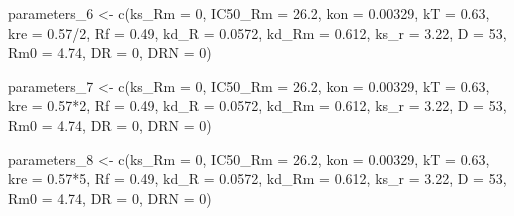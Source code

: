 \documentclass[
]{article}
\newenvironment{Shaded}{\begin{snugshade}}{\end{snugshade}}
\newcommand{\AttributeTok}[1]{\textcolor[rgb]{0.77,0.63,0.00}{#1}}
\newcommand{\DecValTok}[1]{\textcolor[rgb]{0.00,0.00,0.81}{#1}}
\newcommand{\FloatTok}[1]{\textcolor[rgb]{0.00,0.00,0.81}{#1}}
\newcommand{\FunctionTok}[1]{\textcolor[rgb]{0.00,0.00,0.00}{#1}}
\newcommand{\NormalTok}[1]{#1}
\newcommand{\OtherTok}[1]{\textcolor[rgb]{0.56,0.35,0.01}{#1}}
\newcommand{\SpecialCharTok}[1]{\textcolor[rgb]{0.00,0.00,0.00}{#1}}
\begin{document}
\begin{Shaded}
\begin{Highlighting}[]
\NormalTok{parameters\_6 }\OtherTok{\textless{}{-}} \FunctionTok{c}\NormalTok{(}\AttributeTok{ks\_Rm =} \DecValTok{0}\NormalTok{, }\AttributeTok{IC50\_Rm =} \FloatTok{26.2}\NormalTok{, }\AttributeTok{kon =} \FloatTok{0.00329}\NormalTok{,}
                \AttributeTok{kT =} \FloatTok{0.63}\NormalTok{, }\AttributeTok{kre =} \FloatTok{0.57}\SpecialCharTok{/}\DecValTok{2}\NormalTok{, }\AttributeTok{Rf =} \FloatTok{0.49}\NormalTok{, }\AttributeTok{kd\_R =} \FloatTok{0.0572}\NormalTok{,}
                \AttributeTok{kd\_Rm =} \FloatTok{0.612}\NormalTok{, }\AttributeTok{ks\_r =} \FloatTok{3.22}\NormalTok{, }\AttributeTok{D =} \DecValTok{53}\NormalTok{, }\AttributeTok{Rm0 =} \FloatTok{4.74}\NormalTok{,}
                \AttributeTok{DR =} \DecValTok{0}\NormalTok{, }\AttributeTok{DRN =} \DecValTok{0}\NormalTok{)}

\NormalTok{parameters\_7 }\OtherTok{\textless{}{-}} \FunctionTok{c}\NormalTok{(}\AttributeTok{ks\_Rm =} \DecValTok{0}\NormalTok{, }\AttributeTok{IC50\_Rm =} \FloatTok{26.2}\NormalTok{, }\AttributeTok{kon =} \FloatTok{0.00329}\NormalTok{,}
                \AttributeTok{kT =} \FloatTok{0.63}\NormalTok{, }\AttributeTok{kre =} \FloatTok{0.57}\SpecialCharTok{*}\DecValTok{2}\NormalTok{, }\AttributeTok{Rf =} \FloatTok{0.49}\NormalTok{, }\AttributeTok{kd\_R =} \FloatTok{0.0572}\NormalTok{,}
                \AttributeTok{kd\_Rm =} \FloatTok{0.612}\NormalTok{, }\AttributeTok{ks\_r =} \FloatTok{3.22}\NormalTok{, }\AttributeTok{D =} \DecValTok{53}\NormalTok{, }\AttributeTok{Rm0 =} \FloatTok{4.74}\NormalTok{,}
                \AttributeTok{DR =} \DecValTok{0}\NormalTok{, }\AttributeTok{DRN =} \DecValTok{0}\NormalTok{)}

\NormalTok{parameters\_8 }\OtherTok{\textless{}{-}} \FunctionTok{c}\NormalTok{(}\AttributeTok{ks\_Rm =} \DecValTok{0}\NormalTok{, }\AttributeTok{IC50\_Rm =} \FloatTok{26.2}\NormalTok{, }\AttributeTok{kon =} \FloatTok{0.00329}\NormalTok{,}
                \AttributeTok{kT =} \FloatTok{0.63}\NormalTok{, }\AttributeTok{kre =} \FloatTok{0.57}\SpecialCharTok{*}\DecValTok{5}\NormalTok{, }\AttributeTok{Rf =} \FloatTok{0.49}\NormalTok{, }\AttributeTok{kd\_R =} \FloatTok{0.0572}\NormalTok{,}
                \AttributeTok{kd\_Rm =} \FloatTok{0.612}\NormalTok{, }\AttributeTok{ks\_r =} \FloatTok{3.22}\NormalTok{, }\AttributeTok{D =} \DecValTok{53}\NormalTok{, }\AttributeTok{Rm0 =} \FloatTok{4.74}\NormalTok{,}
                \AttributeTok{DR =} \DecValTok{0}\NormalTok{, }\AttributeTok{DRN =} \DecValTok{0}\NormalTok{)}



\end{Highlighting}
\end{Shaded}
\end{document}
